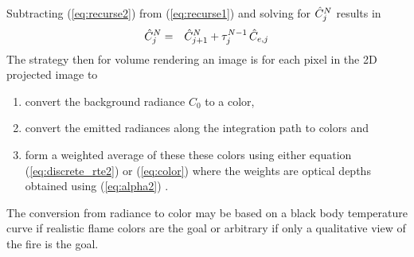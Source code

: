 Subtracting (\ref{eq:recurse2}) from (\ref{eq:recurse1}) and solving for $\hat{C}_{j}^N$ results in
\begin{eqnarray}
\label{eq:color}
\hat{C}_{j}^N&=&\hat{C}_{j+1}^N+\tau_{j}^{N-1}\,\hat{C}_{e,j}
\end{eqnarray}
The strategy then for volume rendering an image is for each pixel in the 2D projected image to
\begin{enumerate}
\item convert the background radiance $C_0$ to a color,
\item convert the emitted radiances along the integration path to colors and
\item form a weighted average of these these colors using either equation (\ref{eq:discrete_rte2}) or (\ref{eq:color}) where the weights are optical depths obtained using (\ref{eq:alpha2}) .
\end{enumerate}
The conversion from radiance to color may be based on a black body temperature curve if realistic flame colors are the goal or arbitrary if only a qualitative view of the fire is the goal.
